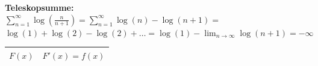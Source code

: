 \columnbreak


\textbf{Teleskopsumme:} \\
\Bsp $\sum_{n = 1}^\infty \log \left(\frac{n}{n+1}\right) = \sum_{n = 1}^\infty \log(n) - \log(n + 1) = $ 
$\log(1) + \log(2) - \log(2) + \dots  = \log(1) - \lim_{n \to \infty} \log(n + 1) = - \infty$ \medskip \\ 



\renewcommand\arraystretch{1.9}

\begin{center}
        \begin{tabular}{c||c}
                $F(x)$ & $F'(x) = f(x)$ \\
                \hline \hline
                

\end{tabular}
\end{center}
